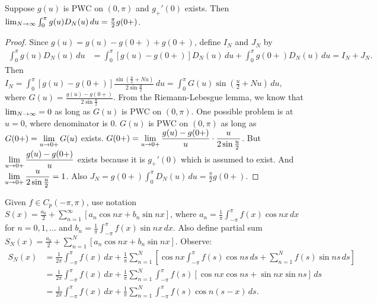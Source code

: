 \documentclass[]{article}
\begin{document}
\begin{lemma}
	Suppose $g(u)$ is PWC on $(0,\pi)$ and $g_+'(0)$ exists. Then $\lim_{N\rightarrow\infty} \int_0^\pi g(u) D_N(u) \, du = \frac{\pi}{2} g(0+)$.
\end{lemma}
\begin{proof} Since $g(u)=g(u)-g(0+)+g(0+)$, define $I_N$ and $J_N$ by
	\begin{align*} \int_0^\pi g(u) D_N(u) \, du &= \int_0^\pi [g(u) - g(0+)]D_N(u)\, du + \int_0^\pi g(0+) D_N(u) \, du = I_N + J_N. \end{align*}
	Then $\displaystyle I_N = \int_0^\pi [g(u) - g(0+)] \frac{\sin{\left(\frac{u}{2}+Nu\right)}}{2\sin{\frac{u}{2}}}\, du = \int_0^\pi G(u) \sin{\left(\frac{u}{2} + Nu\right)} \, du, $ 
	where $\displaystyle G(u) = \frac{g(u)-g(0+)}{2\sin{\frac{u}{2}}}$. 
	From the Riemann-Lebesgue lemma, we know that $\lim_{N\rightarrow\infty} = 0$ as long as $G(u)$ is PWC on $(0,\pi)$.
	One possible problem is at $u=0$, where denominator is 0. $G(u)$ is PWC on $(0,\pi)$ as long as $\displaystyle G(0+) = \lim_{u\rightarrow0+} G(u)$ exists. $\displaystyle G(0+) = \lim_{u\rightarrow0+} \frac{g(u)-g(0+)}{u} \cdot \frac{u}{2\sin{\frac{u}{2}}}$. But $\displaystyle \lim_{u\rightarrow0+} \frac{g(u)-g(0+)}{u}$ exists because it is $g_+'(0)$ which is assumed to exist. And $\displaystyle \lim_{u\rightarrow0+} \frac{u}{2\sin{\frac{u}{2}}} = 1$. Also $J_N = g(0+) \int_0^\pi D_N(u) \, du = \frac{\pi}{2} g(0+)$.
\end{proof}

Given $f\in C_p(-\pi,\pi)$, use notation $\displaystyle S(x) = \frac{a_0}{2} + \sum_{n=1}^\infty [a_n \cos{nx} + b_n\sin{nx}]$, where $a_n = \frac{1}{\pi} \int_{-\pi}^\pi f(x) \cos{nx} \, dx$ for $n=0,1,\dots$ and $b_n = \frac{1}{\pi} \int_{-\pi}^\pi f(x) \sin{nx} \, dx$. Also define partial sum $S_N(x) = \frac{a_0}{2} + \sum_{n=1}^N [ a_n \cos{nx} + b_n \sin{nx}]$. Observe: \begin{align*} S_N(x) &= \frac{1}{2\pi}\int_{-\pi}^\pi f(x) \, dx + \frac{1}{\pi} \sum_{n=1}^N \left[ \cos{nx} \int_{-\pi}^\pi f(s) \cos{ns}\, ds + \sum_{n=1}^N f(s) \sin{ns} \, ds \right] \\ &= \frac{1}{2\pi} \int_{-\pi}^\pi f(x) \, dx + \frac{1}{\pi} \sum_{n=1}^N \int_{-\pi}^\pi f(s) [\cos{nx}\cos{ns} + \sin{nx}\sin{ns}] \, ds \\ &= \frac{1}{2\pi} \int_{-\pi}^\pi f(x) \, dx + \frac{1}{\pi} \sum_{n=1}^N \int_{-\pi}^\pi f(s) \cos{n(s-x)} \, ds .\end{align*}
\end{document}
